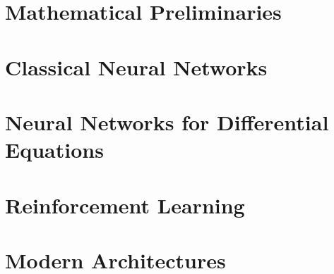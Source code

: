 \documentclass{kaobook}
\begin{document}
\frontmatter


\cleardoublepage 
\color{black}            %
\tableofcontents
\cleardoublepage      
\mainmatter
\part{Mathematical Preliminaries}







%         
%    
%    
%         
%         
%   
%    

\part{Classical Neural Networks}







\part{Neural Networks for Differential Equations}






\part{Reinforcement Learning}



\part{Modern Architectures}


\end{document}
